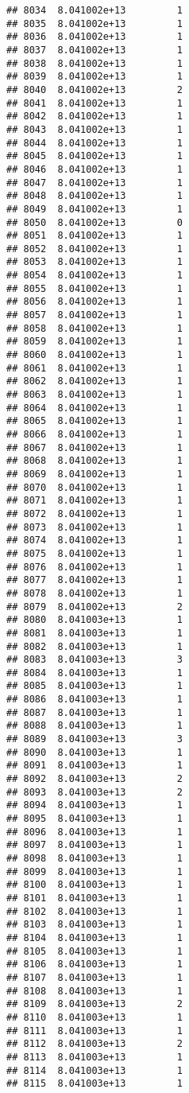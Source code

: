 \documentclass[
]{article}
\begin{document}
\begin{verbatim}
## 8034  8.041002e+13         1
## 8035  8.041002e+13         1
## 8036  8.041002e+13         1
## 8037  8.041002e+13         1
## 8038  8.041002e+13         1
## 8039  8.041002e+13         1
## 8040  8.041002e+13         2
## 8041  8.041002e+13         1
## 8042  8.041002e+13         1
## 8043  8.041002e+13         1
## 8044  8.041002e+13         1
## 8045  8.041002e+13         1
## 8046  8.041002e+13         1
## 8047  8.041002e+13         1
## 8048  8.041002e+13         1
## 8049  8.041002e+13         1
## 8050  8.041002e+13         0
## 8051  8.041002e+13         1
## 8052  8.041002e+13         1
## 8053  8.041002e+13         1
## 8054  8.041002e+13         1
## 8055  8.041002e+13         1
## 8056  8.041002e+13         1
## 8057  8.041002e+13         1
## 8058  8.041002e+13         1
## 8059  8.041002e+13         1
## 8060  8.041002e+13         1
## 8061  8.041002e+13         1
## 8062  8.041002e+13         1
## 8063  8.041002e+13         1
## 8064  8.041002e+13         1
## 8065  8.041002e+13         1
## 8066  8.041002e+13         1
## 8067  8.041002e+13         1
## 8068  8.041002e+13         1
## 8069  8.041002e+13         1
## 8070  8.041002e+13         1
## 8071  8.041002e+13         1
## 8072  8.041002e+13         1
## 8073  8.041002e+13         1
## 8074  8.041002e+13         1
## 8075  8.041002e+13         1
## 8076  8.041002e+13         1
## 8077  8.041002e+13         1
## 8078  8.041002e+13         1
## 8079  8.041002e+13         2
## 8080  8.041003e+13         1
## 8081  8.041003e+13         1
## 8082  8.041003e+13         1
## 8083  8.041003e+13         3
## 8084  8.041003e+13         1
## 8085  8.041003e+13         1
## 8086  8.041003e+13         1
## 8087  8.041003e+13         1
## 8088  8.041003e+13         1
## 8089  8.041003e+13         3
## 8090  8.041003e+13         1
## 8091  8.041003e+13         1
## 8092  8.041003e+13         2
## 8093  8.041003e+13         2
## 8094  8.041003e+13         1
## 8095  8.041003e+13         1
## 8096  8.041003e+13         1
## 8097  8.041003e+13         1
## 8098  8.041003e+13         1
## 8099  8.041003e+13         1
## 8100  8.041003e+13         1
## 8101  8.041003e+13         1
## 8102  8.041003e+13         1
## 8103  8.041003e+13         1
## 8104  8.041003e+13         1
## 8105  8.041003e+13         1
## 8106  8.041003e+13         1
## 8107  8.041003e+13         1
## 8108  8.041003e+13         1
## 8109  8.041003e+13         2
## 8110  8.041003e+13         1
## 8111  8.041003e+13         1
## 8112  8.041003e+13         2
## 8113  8.041003e+13         1
## 8114  8.041003e+13         1
## 8115  8.041003e+13         1

\end{verbatim}
\end{document}
